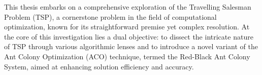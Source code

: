 



This thesis embarks on a comprehensive exploration of the Travelling Salesman Problem (TSP), a cornerstone problem in the field of computational optimization, known for its straightforward premise yet complex resolution. At the core of this investigation lies a dual objective: to dissect the intricate nature of TSP through various algorithmic lenses and to introduce a novel variant of the Ant Colony Optimization (ACO) technique, termed the Red-Black Ant Colony System, aimed at enhancing solution efficiency and accuracy.

